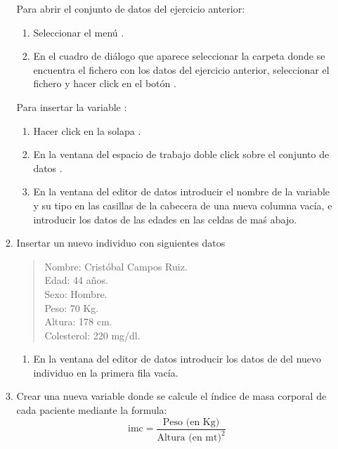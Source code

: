 \begin{enumerate}[leftmargin=*]
\begin{enumerate}
\begin{indicacion}{ Para abrir el conjunto de datos del ejercicio anterior:
\begin{enumerate}
\item Seleccionar el menú .
\item En el cuadro de diálogo que aparece seleccionar la carpeta donde se encuentra el fichero con los datos del ejercicio anterior,
seleccionar el fichero y hacer click en el botón .
\end{enumerate}
Para insertar la variable :
\begin{enumerate}
\item Hacer click en la solapa .
\item En la ventana del espacio de trabajo doble click sobre el conjunto de datos .
\item En la ventana del editor de datos introducir el nombre de la variable  y su tipo en las casillas de la cabecera de una nueva columna vacía, e introducir los datos de las edades en las celdas de maś abajo. 
\end{enumerate}
}
\end{indicacion}

\item Insertar un nuevo individuo con siguientes datos
\begin{quote}
Nombre: Cristóbal Campos Ruiz.\\
Edad: 44 años.\\
Sexo: Hombre.\\
Peso: 70 Kg.\\
Altura: 178 cm.\\
Colesterol: 220 mg/dl.
\end{quote}

\begin{indicacion}{
\begin{enumerate}
\item En la ventana del editor de datos introducir los datos de del nuevo individuo en la primera fila vacía.
\end{enumerate}
}
\end{indicacion}

\item Crear una nueva variable donde se calcule el índice de masa corporal de cada paciente mediante la formula:
\[
\text{imc} = \frac{\text{Peso (en Kg)}}{\text{Altura (en mt)}^2}
\]


\end{enumerate}
\end{enumerate}
